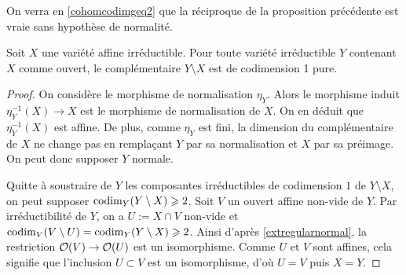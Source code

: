 \begin{rem}
On verra en \ref{cohomcodimgeq2} que la réciproque de la proposition précédente est vraie sans hypothèse de normalité.
\end{rem}

\begin{prop}\label{codimaffinenormal}
Soit $X$ une variété affine irréductible. Pour toute variété irréductible $Y$ contenant $X$ comme ouvert, le complémentaire $Y\setminus X$ est de codimension 1 pure.
\end{prop}
\begin{proof}
On considère le morphisme de normalisation $\eta_Y$. Alors le morphisme induit $\eta_Y^{-1}(X)\rightarrow X$ est le morphisme de normalisation de $X$. On en déduit que $\eta_Y^{-1}(X)$ est affine. De plus, comme $\eta_Y$ est fini, la dimension du complémentaire de $X$ ne change pas en remplaçant $Y$ par sa normalisation et $X$ par sa préimage. On peut donc supposer $Y$ normale.

Quitte à soustraire de $Y$ les composantes irréductibles de codimension $1$ de $Y\setminus X$, on peut supposer $\operatorname{codim}_Y(Y\setminus X)\geqslant 2$. Soit $V$ un ouvert affine non-vide de $Y$. Par irréductibilité de $Y$, on a $U:=X\cap V$ non-vide et $\operatorname{codim}_V(V\setminus U)=\operatorname{codim}_Y(Y\setminus X)\geqslant 2$. Ainsi d'après \ref{extregularnormal}, la restriction $\mathcal{O}(V)\rightarrow \mathcal{O}(U)$ est un isomorphisme. Comme $U$ et $V$ sont affines, cela signifie que l'inclusion $U\subset V$ est un isomorphisme, d'où $U=V$ puis $X=Y$.
\end{proof}


